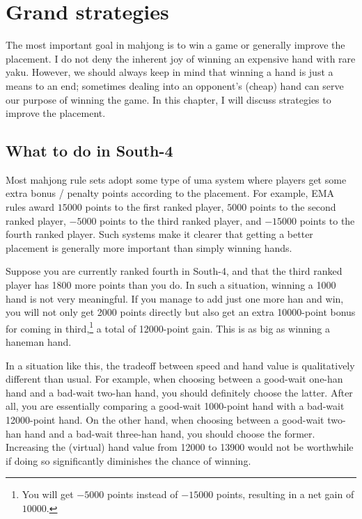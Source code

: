 
\chapter{Grand strategies} \label{ch:grand}
\thispagestyle{empty}
The most important goal in mahjong is to win a game or generally improve the placement. I do not deny the inherent joy of winning an expensive hand with rare {\jap yaku}. However, we should always keep in mind that winning a hand is just a means to an end; sometimes dealing into an opponent's (cheap) hand can serve our purpose of winning the game. 
In this chapter, I will discuss strategies to improve the placement.

\newpage
\section{What to do in South-4}
Most mahjong rule sets adopt some type of {\jap uma} system where players get some extra bonus / penalty points according to the placement. For example, EMA rules award $15000$ points to the first ranked player, $5000$ points to the second ranked player, $-5000$ points to the third ranked player, and $-15000$ points to the fourth ranked player. 
Such systems make it clearer that getting a better placement is generally more important than simply winning hands. 

\bigskip
Suppose you are currently ranked fourth in South-4, and that the third ranked player has 1800 more points than you do. In such a situation, winning a 1000 hand is not very meaningful. If you manage to add just one more {\jap han} and win, you will not only get 2000 points directly but also get an extra 10000-point bonus for coming in third,\footnote{You will get $-5000$ points instead of $-15000$ points, resulting in a net gain of $10000$.} a total of 12000-point gain. This is as big as winning a {\jap haneman} hand. 

\bigskip
In a situation like this, the tradeoff between speed and hand value is qualitatively different than usual. For example, when choosing between a good-wait one-{\jap han} hand and a bad-wait two-{\jap han} hand, you should definitely choose the latter. After all, you are essentially comparing a good-wait 1000-point hand with a bad-wait 12000-point hand. On the other hand, when choosing between a good-wait two-{\jap han} hand and a bad-wait three-{\jap han} hand, you should choose the former. Increasing the (virtual) hand value from 12000 to 13900 would not be worthwhile if doing so significantly diminishes the chance of winning. 

